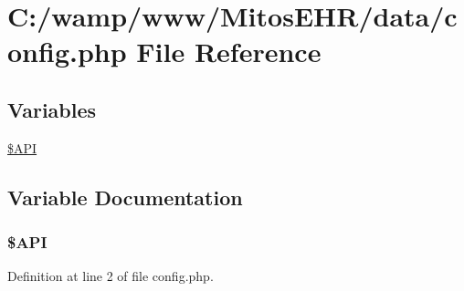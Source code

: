 \hypertarget{data_2config_8php}{\section{\-C\-:/wamp/www/\-Mitos\-E\-H\-R/data/config.php \-File \-Reference}
\label{data_2config_8php}
}
\subsection*{\-Variables}
\begin{DoxyCompactItemize}
\item 
\hyperlink{data_2config_8php_aeb2e7ad00ea666b4b6dfcf82008194f8}{\$\-A\-P\-I}
\end{DoxyCompactItemize}


\subsection{\-Variable \-Documentation}
\hypertarget{data_2config_8php_aeb2e7ad00ea666b4b6dfcf82008194f8}{
\subsubsection[{\$\-A\-P\-I}]{\setlength{\rightskip}{0pt plus 5cm}\$\-A\-P\-I}}\label{data_2config_8php_aeb2e7ad00ea666b4b6dfcf82008194f8}


\-Definition at line 2 of file config.\-php.

